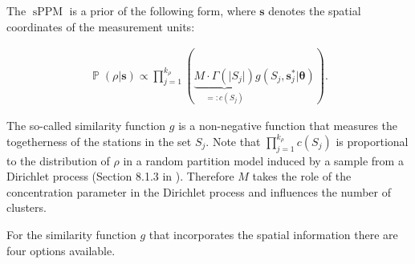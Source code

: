 \documentclass[12pt,a4paper]{article}
\DeclareMathOperator{\sPPM}{\mathrm{sPPM}}
\DeclareMathOperator{\PP}{\mathbb{P}}
\begin{document}
The $\sPPM$ is a prior of the following form, where $\mathbf{s}$ denotes the spatial coordinates of the measurement units:

\begin{align} \label{sPPM-prior}
    \PP(\rho | \pmb{s} ) \propto \prod_{j=1}^{k_{\rho}} \left( \underbrace{M \cdot \Gamma(\vert S_j \vert) }_{=:c(S_j)}g(S_j, \pmb{s}^*_j \vert \pmb{\theta}) \right) .
\end{align}

The so-called similarity function $g$ is a non-negative function that measures the togetherness of the stations in the set $S_j$.
Note that $\prod_{j=1}^{k_{\rho}} c(S_j) $ is proportional to the distribution of $\rho$ in a random partition model induced by a sample from a Dirichlet process (Section 8.1.3 in \cite{lecturenotes}). Therefore $M$ takes the role of the concentration parameter in the Dirichlet process and influences the number of clusters.\medskip

For the similarity function $g$ that incorporates the spatial information there are four options available. \medskip
\end{document}
